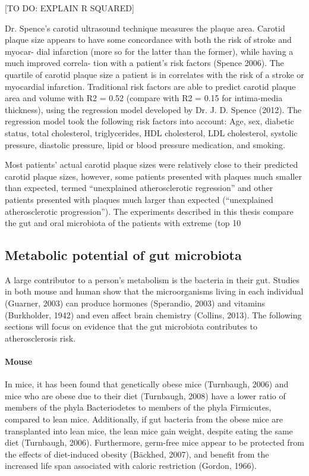 [TO DO: EXPLAIN R SQUARED]

Dr. Spence’s carotid ultrasound technique measures the plaque area. Carotid plaque size appears to have some concordance with both the risk of stroke and myocar-
dial infarction (more so for the latter than the former), while having a much improved correla-
tion with a patient’s risk factors (Spence 2006). The quartile of carotid plaque size a patient is in correlates with the risk of a stroke or myocardial infarction. Traditional risk factors are able to predict carotid plaque area and volume with R2 = 0.52 (compare with R2 = 0.15 for intima-media thickness), using the regression model developed by Dr. J. D. Spence (2012). The regression model took the following risk factors into account: Age, sex, diabetic status, total cholesterol, triglycerides, HDL cholesterol, LDL cholesterol, systolic pressure, diastolic pressure, lipid or blood pressure medication, and smoking.

Most patients’ actual carotid plaque sizes were relatively close to their predicted carotid plaque sizes, however, some patients presented with plaques much smaller than expected, termed “unexplained atherosclerotic regression” and other patients presented with plaques much larger than expected (“unexplained atherosclerotic progression”). The experiments described in this thesis compare the gut and oral microbiota of the patients with extreme (top 10%

\subsection{Metabolic potential of gut microbiota}
A large contributor to a person’s metabolism is the bacteria in their gut. Studies in both mouse and human show that the microorganisms living in each individual (Guarner, 2003) can produce hormones (Sperandio, 2003) and vitamins (Burkholder, 1942) and even affect brain chemistry (Collins, 2013). The following sections will focus on evidence that the gut microbiota contributes to atherosclerosis risk.

\paragraph{Mouse}
In mice, it has been found that genetically obese mice (Turnbaugh, 2006) and mice who are obese due to their diet (Turnbaugh, 2008) have a lower ratio of members of the phyla Bacteriodetes to members of the phyla Firmicutes, compared to lean mice. Additionally, if gut bacteria from the obese mice are transplanted into lean mice, the lean mice gain weight, despite eating the same diet (Turnbaugh, 2006). Furthermore, germ-free mice appear to be protected from the effects of diet-induced obesity (Bäckhed, 2007), and benefit from the increased life span associated with caloric restriction (Gordon, 1966).

